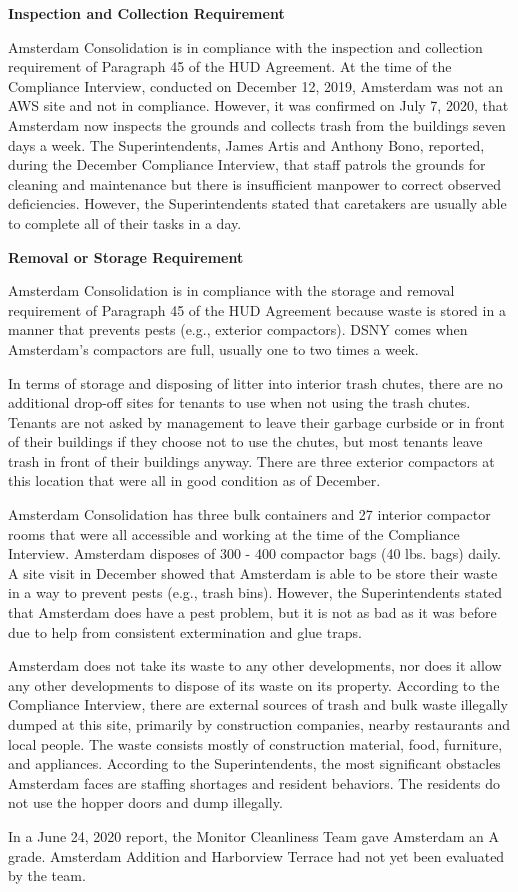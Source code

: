 
\textbf{Inspection and Collection Requirement}

Amsterdam Consolidation is in compliance with the inspection and collection requirement of Paragraph 45 of the HUD Agreement. At the time of the Compliance Interview, conducted on December 12, 2019, Amsterdam was not an AWS site and not in compliance. However, it was confirmed on July 7, 2020, that Amsterdam now inspects the grounds and collects trash from the buildings seven days a week. The Superintendents, James Artis and Anthony Bono, reported, during the December Compliance Interview, that staff patrols the grounds for cleaning and maintenance but there is insufficient manpower to correct observed deficiencies. However, the Superintendents stated that caretakers are usually able to complete all of their tasks in a day.

\textbf{Removal or Storage Requirement}

Amsterdam Consolidation is in compliance with the storage and removal requirement of Paragraph 45 of the HUD Agreement because waste is stored in a manner that prevents pests (e.g., exterior compactors). DSNY comes when Amsterdam's compactors are full, usually one to two times a week.

In terms of storage and disposing of litter into interior trash chutes, there are no additional drop-off sites for tenants to use when not using the trash chutes. Tenants are not asked by management to leave their garbage curbside or in front of their buildings if they choose not to use the chutes, but most tenants leave trash in front of their buildings anyway. There are three exterior compactors at this location that were all in good condition as of December.

Amsterdam Consolidation has three bulk containers and 27 interior compactor rooms that were all accessible and working at the time of the Compliance Interview. Amsterdam disposes of 300 - 400 compactor bags (40 lbs. bags) daily. A site visit in December showed that Amsterdam is able to be store their waste in a way to prevent pests (e.g., trash bins). However, the Superintendents stated that Amsterdam does have a pest problem, but it is not as bad as it was before due to help from consistent extermination and glue traps. 

Amsterdam does not take its waste to any other developments, nor does it allow any other developments to dispose of its waste on its property. According to the Compliance Interview, there are external sources of trash and bulk waste illegally dumped at this site, primarily by construction companies, nearby restaurants and local people. The waste consists mostly of construction material, food, furniture, and appliances. According to the  Superintendents, the most significant obstacles Amsterdam faces are staffing shortages and resident behaviors. The residents do not use the hopper doors and dump illegally. 

In a June 24, 2020 report, the Monitor Cleanliness Team gave Amsterdam an A grade. Amsterdam Addition and Harborview Terrace had not yet been evaluated by the team. 